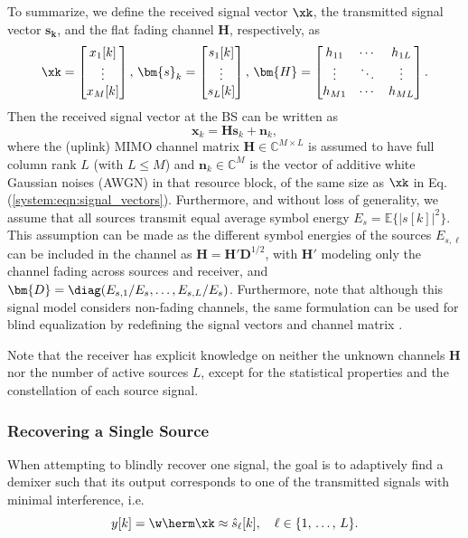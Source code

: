 To summarize, we define the received signal vector $\xk$, the transmitted signal vector $\bm{s_k}$, and the flat fading channel $\bm{H}$, respectively, as 
\begin{align}
	\xk=\begin{bmatrix}
		x_1[k]\\\vdots\\x_M[k]
	\end{bmatrix},\, \bm{s}_k=\begin{bmatrix}
		s_1[k]\\\vdots\\s_L[k]
	\end{bmatrix},\,
	\bm{H}=\begin{bmatrix}
		h_{11}&\cdots&h_{1L}\\
		\vdots&\ddots&\vdots\\
		h_{M1}&\cdots&h_{ML}
	\end{bmatrix}.
	\label{system:eqn:signal_vectors}
\end{align}
Then the received signal vector at the BS can be written as
\begin{equation}
	\bm{x}_k=\bm{H}\bm{s}_k+\bm{n}_k, \label{system:eqn:rxsignal}
\end{equation}
where the (uplink) MIMO channel matrix $\bm{H}\in\mathbb{C}^{M\times L}$ is assumed to have full column rank $L$ (with $L\leq M$) and $\bm{n}_k\in\mathbb{C}^M$ is the vector of additive white Gaussian noises (AWGN) in that resource block, of the same size as $\xk$ in Eq.(\ref{system:eqn:signal_vectors}). Furthermore, and without loss of generality, we assume that all sources transmit equal average symbol energy $E_s=\mathbb{E}\big\{|s[k]|^2\big\}$. 
This assumption can be made as the different symbol energies of the sources $E_{s,\ell}$ can be included in the channel as $\bm{H}={\bm{H}'}\bm{D}^{1/2}$, with ${\bm{H}'}$ modeling only the channel fading across sources and receiver, and $\bm{D}=\diag(E_{s,1}/E_s,\ldots,E_{s,L}/E_s)$. Furthermore, note that although this signal model considers non-fading channels, the same formulation can be used for blind equalization by redefining the signal vectors and channel matrix \cite{Ding2000}.

Note that the receiver has explicit knowledge on neither the unknown channels $\bm{H}$ nor the number of active sources $L$, except for the statistical properties and the constellation of each source signal. 

\subsubsection{Recovering a Single Source}
When attempting to blindly recover one signal, the goal is to adaptively find a demixer such that its output corresponds to one of the transmitted signals with minimal interference, i.e.  
\begin{equation}
	{y}[k]=\w\herm \xk \approx \hat{s}_{\ell}[k],\quad	\ell\in\{1,\,\ldots,\, L\}. \label{system:eqn:ssr_demixer_output}
\end{equation}

